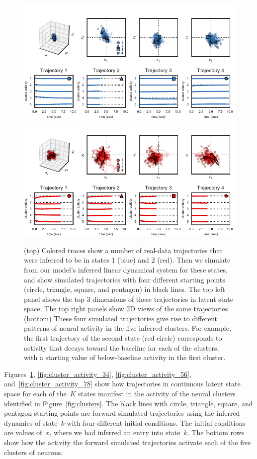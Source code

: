 \documentclass{article}
\begin{document}
\begin{figure}[h]
\centering%
\includegraphics[width=5in]{figures/arhmm/cluster_activity_0.pdf}
\includegraphics[width=5in]{figures/arhmm/cluster_activity_1.pdf}
\caption{(top) Colored traces show a number of real-data trajectories
  that were inferred to be in states 1 (blue) and 2 (red).  Then we
  simulate from our model's inferred linear dynamical system for these
  states, and show simulated trajectories with four different starting
  points (circle, triangle, square, and pentagon) in black lines.
  The top left panel shows the top 3 dimensions of these trajectories
  in latent state space. The
  top right panels show 2D views of the same trajectories.  (bottom)
  These four simulated trajectories give rise to different patterns of
  neural activity in the five inferred clusters.  For example, the
  first trajectory of the second state (red circle) corresponds to
  activity that decays toward the baseline for each of the clusters,
  with a starting value of below-baseline activity in the first
  cluster.}
\label{fig:cluster_activity_12}
\end{figure}

Figures~\ref{fig:cluster_activity_12}, \ref{fig:cluster_activity_34},
\ref{fig:cluster_activity_56}, and~\ref{fig:cluster_activity_78} show
how trajectories in continuous latent state space for each of the~$K$
states manifest in the activity of the neural clusters identified in
Figure~\ref{fig:clusters}.  The black lines with circle, triangle,
square, and pentagon starting points are forward simulated
trajectories using the inferred dynamics of state~$k$ with four
different initial conditions. The initial conditions are values
of~$x_t$ where we had inferred an entry into state~$k$.
The bottom rows show how the activity the forward
simulated trajectories activate each of the five clusters of
neurons.
\end{document}
